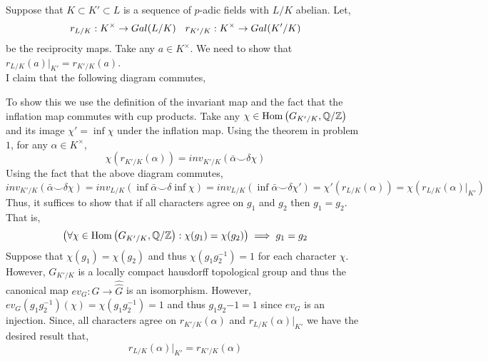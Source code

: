 \documentclass[12pt]{extarticle}
\begin{document}
\section{} 

Suppose that $K \subset K' \subset L$ is a sequence of $p$-adic fields with $L/K$ abelian. Let,
\[ r_{L/K} : K^\times \to Gal \small(L/K \small) \quad r_{K'/K} : K^\times \to Gal \small(K'/K \small) \]
be the reciprocity maps. Take any $a \in K^\times$. We need to show that $r_{L/K}(a)|_{K'} = r_{K'/K}(a)$. 
\bigskip\\
I claim that the following diagram commutes,
\begin{center}
\end{center}
To show this we use the definition of the invariant map and the fact that the inflation map commutes with cup products. 
Take any $\chi \in \mathrm{Hom}\left(G_{K'/K}, \mathbb{Q}/\mathbb{Z}\right)$ and its image $\chi' = \inf{\chi}$ under the inflation map. Using the theorem in problem $1$, for any $\alpha \in K^\times$,
\[ \chi(r_{K'/K}(\alpha)) = inv_{K'/K}(\bar{\alpha} \smile \delta \chi) \]
Using the fact that the above diagram commutes,
\[ inv_{K'/K}(\bar{\alpha} \smile \delta \chi) = inv_{L/K}(\inf \bar{\alpha} \smile \delta \inf{\chi}) = inv_{L/K}(\inf \bar{\alpha} \smile \delta \chi') = \chi'(r_{L/K}(\alpha)) = \chi(r_{L/K}(\alpha) |_{K'}) \]
Thus, it suffices to show that if all characters agree on $g_1$ and $g_2$ then $g_1 = g_2$. That is, 
\[ \left( \forall \chi \in \mathrm{Hom}\left(G_{K'/K}, \mathbb{Q}/\mathbb{Z}\right) : \chi(g_1) = \chi(g_2) \right) \implies g_1 = g_2 \]
Suppose that $\chi(g_1) = \chi(g_2)$ and thus $\chi(g_1 g_2^{-1}) = 1$ for each character $\chi$. However, $G_{K'/K}$ is a locally compact hausdorff topological group and thus the canonical map $ev_G : G \to \hat{\hat{G}}$ is an isomorphism. However, $ev_G(g_1 g_2^{-1})(\chi) = \chi(g_1 g_2^{-1}) = 1$ and thus $g_1 g_2{-1} = 1$ since $ev_G$ is an injection. Since, all characters agree on $r_{K'/K}(\alpha)$ and $r_{L/K}(\alpha) |_{K'}$ we have the desired result that,
\[ r_{L/K}(\alpha) |_{K'} = r_{K'/K}(\alpha) \]
\end{document}
